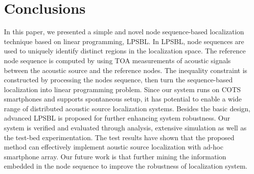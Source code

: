 
\section{Conclusions}

In this paper, we presented a simple and novel node sequence-based localization technique based on linear programming, LPSBL. 
In LPSBL, node sequences are used to uniquely identify distinct regions in the localization space. 
The reference node sequence is computed by using TOA measurements of acoustic signals between the acoustic source and the reference nodes.
The inequality constraint is constructed by processing the nodes sequence, then turn the sequence-based localization into linear programming problem. 
Since our system runs on COTS smartphones and supports spontaneous setup, 
 it has potential to enable a wide range of distributed acoustic source localization systems. 
 Besides the basic design, advanced LPSBL is proposed for further enhancing system robustness.
 Our system is verified and evaluated through analysis, extensive simulation as well as the test-bed experimentation.
 The test results have shown that the proposed method can effectively implement aoustic source localization with ad-hoc smartphone array.
 Our future work is that further mining the information embedded in the node sequence to improve the robustness of localization system.


